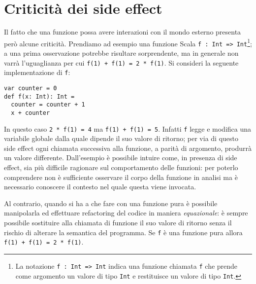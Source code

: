 \section{Criticità dei side effect}
\label{section:criticita-dei-side-effect}

Il fatto che una funzione possa avere interazioni con il mondo esterno presenta però alcune criticità.
Prendiamo ad esempio una funzione Scala \lstinline{f : Int => Int}\footnote{La notazione \lstinline{f : Int => Int} indica una funzione chiamata \lstinline{f} che prende come argomento un valore di tipo \lstinline{Int} e restituisce un valore di tipo \lstinline{Int}.}; a una prima osservazione potrebbe risultare sorprendente, ma in generale non varrà l'uguaglianza per cui \lstinline{f(1) + f(1) = 2 * f(1)}.
Si consideri la seguente implementazione di \lstinline{f}:
\begin{lstlisting}[language=scala3]
var counter = 0
def f(x: Int): Int =
  counter = counter + 1
  x + counter
\end{lstlisting}
In questo caso \lstinline{2 * f(1) = 4} ma \lstinline{f(1) + f(1) = 5}.
Infatti \lstinline{f} legge e modifica una variabile globale dalla quale dipende il suo valore di ritorno; per via di questo side effect ogni chiamata successiva alla funzione, a parità di argomento, produrrà un valore differente.
Dall'esempio è possibile intuire come, in presenza di side effect, sia più difficile ragionare sul comportamento delle funzioni: per poterlo comprendere non è sufficiente osservare il corpo della funzione in analisi ma è necessario conoscere il contesto nel quale questa viene invocata.

Al contrario, quando si ha a che fare con una funzione pura è possibile manipolarla ed effettuare refactoring del codice in maniera \emph{equazionale}: è sempre possibile sostituire alla chiamata di funzione il suo valore di ritorno senza il rischio di alterare la semantica del programma. Se \lstinline{f} è una funzione pura allora \lstinline{f(1) + f(1) = 2 * f(1)}.

